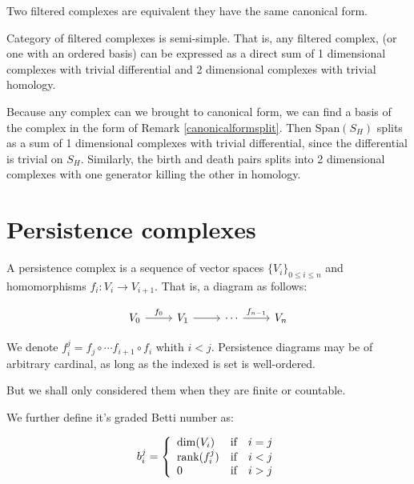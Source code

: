 \begin{corollary}
Two filtered complexes are equivalent
\ifff they have the same canonical form.
\end{corollary}


\begin{corollary}{Category of filtered complexes is semi-simple.}
That is, any filtered complex, (or one with an ordered basis) can be expressed as a direct sum of 
1 dimensional complexes with trivial differential and 2 dimensional complexes with trivial homology.
\end{corollary}

\begin{prof}
Because any complex can we brought to canonical form, we can find a basis of the complex in the form of Remark \ref{canonicalformsplit}.
Then $\text{Span}(S_H)$ splits as a sum of 1 dimensional complexes with trivial differential, since the differential is trivial on $S_H$.
Similarly, the birth and death pairs splits into 2 dimensional complexes with one generator killing the other in homology.

\end{prof}


\section{Persistence complexes}

\begin{definition}
A persistence complex is a sequence of vector spaces 
$\{V_i\}_{0\leq i \leq n}$ and homomorphisms
 $f_i:V_i\to V_{i+1}$. That is, a diagram
as follows:


$$
\begin{tikzcd}
V_0 \arrow[r,"f_0"]
& V_1 \arrow[r]
& \cdots\arrow[r,"f_{n-1}"]
& V_n
\end{tikzcd}
$$


We denote $f_i^j
=
f_j\circ\cdots f_{i+1}\circ f_i
$ whith $i<j$.
Persistence diagrams may be of arbitrary cardinal,
as long as the indexed is set is well-ordered.

But we shall only considered them when they are finite or countable.

We further define it's graded Betti number as:

$$
b_i^j
=\left\{
\begin{array}{l c c}
\dim(V_i) & \text{if} & i=j\\
\text{rank}(f_i^j) & \text{if} & i<j\\
0 & \text{if} & i>j\\
\end{array}
\right.
$$

\end{definition}

